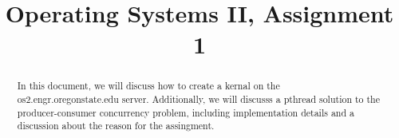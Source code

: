 \documentclass[letterpaper,onecolumn,10pt,titlepage]{IEEEtran}
\begin{document}
\begin{titlepage}
\title{Operating Systems II, Assignment 1}
\author
{
}
	\maketitle
	\vspace{4cm}
	\begin{abstract}
		\noindent In this document, we will discuss how to create a kernal on the os2.engr.oregonstate.edu server. Additionally, we will discusss a pthread solution to the producer-consumer concurrency problem, including implementation details and a discussion about the reason for the assingment.\\
	\end{abstract}
	
\end{titlepage}

\newpage
\end{document}
